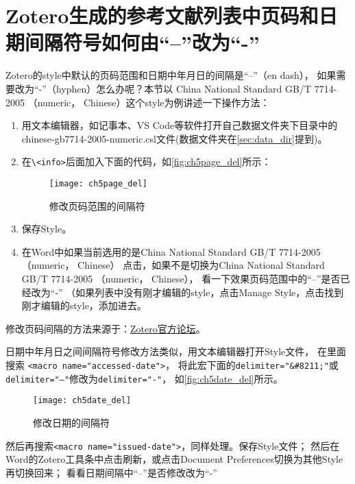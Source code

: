 \documentclass[cn,11pt,chinese]{elegantbook}
\begin{document}
		\section{Zotero生成的参考文献列表中页码和日期间隔符号如何由“–”改为“-”}\label{sec:DashToHyphen}		
			Zotero的style中默认的页码范围和日期中年月日的间隔是“–”（en dash），
			如果需要改为“-”（hyphen）怎么办呢？本节以
			China National Standard GB/T 7714-2005 （numeric， Chinese）这个style为例讲述一下操作方法：
				\begin{enumerate}
					\item 用文本编辑器，如记事本、VS Code等软件打开自己数据文件夹下目录中的
					chinese-gb7714-2005-numeric.csl文件(数据文件夹在\cref{sec:data_dir}提到)。
					\item 在\verb|\<info>|后面加入下面的代码，如\autoref{fig:ch5page_del}所示：
									\begin{figure}[ht]
										\centering
										\texttt{[image: ch5page\_del]}
										\caption{修改页码范围的间隔符}
										\label{fig:ch5page_del}
									\end{figure}
					\item 保存Style。
					\item 在Word中如果当前选用的是China National Standard GB/T 7714-2005 （numeric， Chinese）
					点击，如果不是切换为China National Standard GB/T 7714-2005 （numeric， Chinese），
					看一下效果页码范围中的“–”是否已经改为“-”
					（如果列表中没有刚才编辑的style，点击Manage Style，点击\menu{+}找到刚才编辑的style，添加进去。
				\end{enumerate}
				
				修改页码间隔的方法来源于：\href{https://forums.zotero.org/discussion/comment/320230#Comment_320230}
		{Zotero官方论坛}。

		日期中年月日之间间隔符号修改方法类似，用文本编辑器打开Style文件，
		在里面搜索 \verb|<macro name="accessed-date">|，
		将此宏下面的\verb|delimiter="&#8211;"|或\verb|delimiter="–"|修改为\verb|delimiter="-"|，
		如\autoref{fig:ch5date_del}所示。
						\begin{figure}[ht]
							\centering
							\texttt{[image: ch5date\_del]}
							\caption{修改日期的间隔符}
							\label{fig:ch5date_del}
						\end{figure}
		然后再搜索\verb|<macro name="issued-date">|，同样处理。保存Style文件；
		然后在Word的Zotero工具条中点击刷新，或点击Document Preferences切换为其他Style再切换回来；		
		看看日期间隔中“–”是否修改改为“-”
\end{document}
